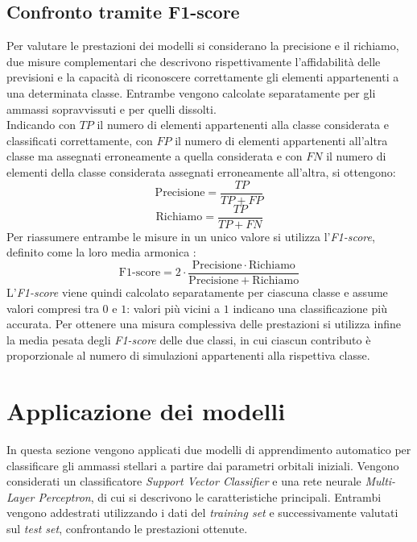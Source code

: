 \subsection{Confronto tramite F1-score}
\label{subsec:confronto-f1-score}
Per valutare le prestazioni dei modelli si considerano la precisione e il richiamo, due misure complementari che descrivono rispettivamente l'affidabilità delle previsioni e la capacità di riconoscere correttamente gli elementi appartenenti a una determinata classe. Entrambe vengono calcolate separatamente per gli ammassi sopravvissuti e per quelli dissolti.\\ Indicando con $TP$ il numero di elementi appartenenti alla classe considerata e classificati correttamente, con $FP$ il numero di elementi appartenenti all'altra classe ma assegnati erroneamente a quella considerata e con $FN$ il numero di elementi della classe considerata assegnati erroneamente all'altra, si ottengono:
\begin{equation}
	\mathrm{Precisione} = \frac{TP}{TP+FP}
	\label{eq:precisione}
\end{equation}
\begin{equation}
	\mathrm{Richiamo} = \frac{TP}{TP+FN}
	\label{eq:richiamo}
\end{equation}
Per riassumere entrambe le misure in un unico valore si utilizza l'\emph{F1-score}, definito come la loro media armonica \cite{sokolova2009systematic}:
\begin{equation}
	\mathrm{F1\text{-}score} = 2 \cdot \frac{\mathrm{Precisione}\cdot\mathrm{Richiamo}}{\mathrm{Precisione}+\mathrm{Richiamo}}
	\label{eq:f1-score}
\end{equation}
L'\emph{F1-score} viene quindi calcolato separatamente per ciascuna classe e assume valori compresi tra $0$ e $1$: valori più vicini a $1$ indicano una classificazione più accurata. Per ottenere una misura complessiva delle prestazioni si utilizza infine la media pesata degli \emph{F1-score} delle due classi, in cui ciascun contributo è proporzionale al numero di simulazioni appartenenti alla rispettiva classe.
\section{Applicazione dei modelli}
\label{sec:applicazione-modelli}
In questa sezione vengono applicati due modelli di apprendimento automatico per classificare gli ammassi stellari a partire dai parametri orbitali iniziali. Vengono considerati un classificatore \emph{Support Vector Classifier} e una rete neurale \emph{Multi-Layer Perceptron}, di cui si descrivono le caratteristiche principali. Entrambi vengono addestrati utilizzando i dati del \emph{training set} e successivamente valutati sul \emph{test set}, confrontando le prestazioni ottenute.
